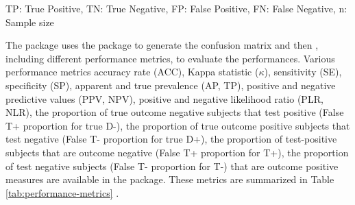 TP: True Positive, TN: True Negative, FP: False Positive, FN: False Negative, n: Sample size
\medskip

The  package uses the  \citep{yin2014optimal} package to generate the confusion matrix and then  \citep{stevenson2017epir}, including different performance metrics, to evaluate the performances. Various performance metrics accuracy rate (ACC), Kappa statistic (\(\kappa\)), sensitivity (SE), specificity (SP), apparent and true prevalence (AP, TP), positive and negative predictive values (PPV, NPV), positive and negative likelihood ratio (PLR, NLR), the proportion of true outcome negative subjects that test positive (False T+ proportion for true D-), the proportion of true outcome positive subjects that test negative (False T- proportion for true D+), the proportion of test-positive subjects that are outcome negative (False T+ proportion for T+), the proportion of test negative subjects (False T- proportion for T-) that are outcome positive measures are available in the  package. These metrics are summarized in Table \ref{tab:performance-metrics} .

